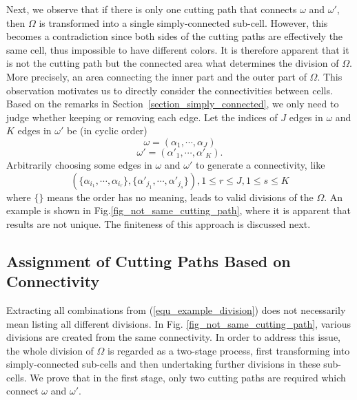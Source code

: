 \documentclass[Afour,sageh,times]{sagej}
\begin{document}
Next, we observe that if there is only one cutting path that connects $\omega$ and $\omega'$, then $\Omega$ is transformed into a 
single simply-connected sub-cell. However, this becomes a contradiction since both sides of the cutting paths are effectively the same cell, 
thus impossible to have different colors. It is therefore apparent that it is not the cutting path but the connected area what determines 
the division of $\Omega$. More precisely, an area connecting the inner part and the outer part of $\Omega$. 
This observation motivates us to directly consider the connectivities between cells. Based on the remarks in 
Section~\ref{section_simply_connected}, we only need to judge whether keeping or removing each edge. 
Let the indices of $J$ edges in $\omega$ and $K$ edges in $\omega'$ be (in cyclic order) 
\begin{equation}\label{equ_omega}
\omega = (\alpha_1, \cdots, \alpha_J)
\end{equation}
\begin{equation}\label{equ_omega_prime}
\omega' = (\alpha'_1, \cdots, \alpha'_K).
\end{equation}
Arbitrarily choosing some edges in $\omega$ and $\omega'$ to generate a connectivity, like
\begin{equation}\label{equ_example_division}
(\{\alpha_{i_1}, \cdots, \alpha_{i_r}\}, \{\alpha'_{j_1}, \cdots, \alpha'_{j_s}\} ), 1\leq r\leq J, 1\leq s\leq K
\end{equation}
where $\{\}$ means the order has no meaning, leads to valid divisions of the $\Omega$. An example is shown in 
Fig.\ref{fig_not_same_cutting_path}, where it is apparent that results are not unique. The finiteness of this approach is discussed next. 


\subsection{Assignment of Cutting Paths Based on Connectivity}
\label{subsection_arbitrary_assignment}
Extracting all combinations from (\ref{equ_example_division}) does not necessarily mean listing all different divisions. 
In Fig. \ref{fig_not_same_cutting_path}, various divisions are created from the same connectivity. 
In order to address this issue, the whole division of $\Omega$ is regarded as a two-stage process, first transforming into simply-connected sub-cells and then undertaking further divisions in these sub-cells. 
We prove that in the first stage, only two cutting paths are required which connect $\omega$ and $\omega'$. 
\end{document}
